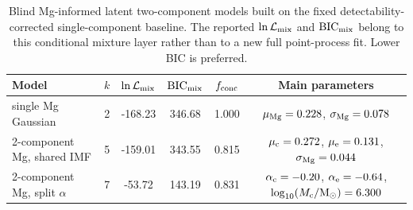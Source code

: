 \begin{table}
\caption{Blind Mg-informed latent two-component models built on the fixed detectability-corrected single-component baseline. The reported $\ln \mathcal{L}_{\rm mix}$ and ${\rm BIC}_{\rm mix}$ belong to this conditional mixture layer rather than to a new full point-process fit. Lower BIC is preferred.}
\label{tab:blind_mg_models}
\small
\begin{tabular}{lccccc}
\hline
Model & $k$ & $\ln \mathcal{L}_{\rm mix}$ & ${\rm BIC}_{\rm mix}$ & $f_{\rm conc}$ & Main parameters \\
\hline
single Mg Gaussian & 2 & -168.23 & 346.68 & 1.000 & $\mu_{\rm Mg}=0.228$, $\sigma_{\rm Mg}=0.078$ \\
2-component Mg, shared IMF & 5 & -159.01 & 343.55 & 0.815 & $\mu_{\rm c}=0.272$, $\mu_{\rm e}=0.131$, $\sigma_{\rm Mg}=0.044$ \\
2-component Mg, split $\alpha$ & 7 & -53.72 & 143.19 & 0.831 & $\alpha_{\rm c}=-0.20$, $\alpha_{\rm e}=-0.64$, $\log_{10}(M_{\rm c}/{\rm M}_\odot)=6.300$ \\
\hline
\end{tabular}
\end{table}
